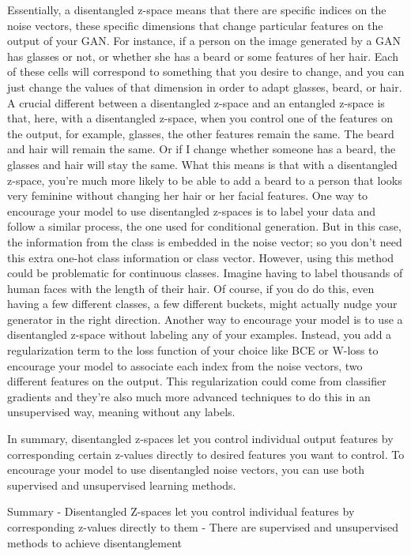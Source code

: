 \documentclass[11pt, onecolumn]{article}
\begin{document}
Essentially, a disentangled z-space means that there are
specific indices on the noise vectors,
these specific dimensions that
change particular features on the output of your GAN.
For instance, if a person on
the image generated by a GAN has glasses or not,
or whether she has a beard or some features of her hair.
Each of these cells will correspond to
something that you desire to change,
and you can just change the values of that dimension in
order to adapt glasses, beard, or hair.
A crucial different between
a disentangled z-space and
an entangled z-space is that, here,
with a disentangled z-space,
when you control one of the features on the output,
for example, glasses, the other features remain the same.
The beard and hair will remain the same.
Or if I change whether someone has a beard,
the glasses and hair will stay the same.
What this means is that with a disentangled z-space,
you're much more likely to be able
to add a beard to a person that looks
very feminine without changing
her hair or her facial features.
One way to encourage your model to use
disentangled z-spaces is to
label your data and follow a similar process,
the one used for conditional generation.
But in this case, the information from
the class is embedded in the noise vector;
so you don't need this extra
one-hot class information or class vector.
However, using this method
could be problematic for continuous classes.
Imagine having to label thousands
of human faces with the length of their hair.
Of course, if you do do this,
even having a few different classes,
a few different buckets,
might actually nudge your generator
in the right direction.
Another way to encourage your model is to use
a disentangled z-space without
labeling any of your examples.
Instead, you add a regularization term
to the loss function of your choice like
BCE or W-loss to encourage your model
to associate each index from the noise vectors,
two different features on the output.
This regularization could come
from classifier gradients and they're
also much more advanced techniques
to do this in an unsupervised way,
meaning without any labels.

In summary, disentangled z-spaces let you control individual output features by corresponding certain z-values directly to desired features you want to control.
To encourage your model to
use disentangled noise vectors,
you can use both supervised
and unsupervised learning methods. 

Summary 
- Disentangled Z-spaces let you control individual features by corresponding z-values directly to them
- There are supervised and unsupervised methods to achieve disentanglement
\end{document}
